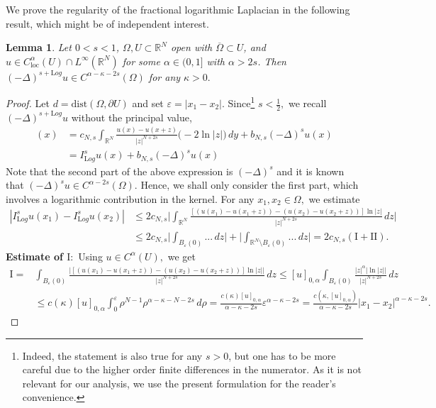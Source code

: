 \documentclass[notitlepage,11pt,reqno]{amsart}
\newtheorem{lemma}[theorem]{Lemma}
\theoremstyle{definition}
\numberwithin{equation}{section}
\newcommand{\loc}{\mathrm{loc}}
\newcommand{\RR}{\mathds{R}}
\begin{document}
We prove the regularity of the fractional logarithmic Laplacian in the following result, which might be of independent interest.
\begin{lemma}\label{holder for frac log laplacian}
  Let $0<s<1$, $\Omega,U\subset \RR^N$ open with $\overline{\Omega}\subset U$, and $u \in C^{\alpha}_{\loc}(U)\cap L^{\infty}(\RR^N)$ for some $\alpha\in (0,1]$ with $\alpha>2s$. Then $(-\Delta)^{s+\mathrm Log} u\in C^{\alpha-\kappa -2s}(\Omega)$ for any $\kappa>0.$
\end{lemma}
\begin{proof}
 Let $d=\text{dist}(\Omega, \partial U)$ and set $\varepsilon = |x_1-x_2|.$ Since\footnote{Indeed, the statement is also true for any $s>0$, but one has to be more careful due to the higher order finite differences in the numerator. As it is not relevant for our analysis, we use the present formulation for the reader's convenience.} $s<\frac{1}{2}, $ we recall $(-\Delta)^{s+\mathrm Log}u$ without the principal value,
 \begin{align*}
  [(-\Delta)^{s+\mathrm Log}u](x)&= c_{N,s}\int_{\RR^N} \frac{u(x)-u(x+z)}{|z|^{N+2s}}\bigl(-2\ln|z|\bigr)\,dy+b_{N,s}(-\Delta)^s u(x)\\
  &=I^s_{\mathrm Log}u (x)+b_{N, s}(-\Delta)^s u(x)    
 \end{align*}
 Note that the second part of the above expression is $(-\Delta)^s$ and it is known that $(-\Delta)^su \in C^{\alpha-2s}(\Omega).$ Hence, we shall only consider the first part, which involves a logarithmic contribution in the kernel. For any $x_1, x_2 \in \Omega,$ we estimate
\begin{align*}
    |I^s_{\mathrm Log} u(x_1)-I^s_{\mathrm Log} u(x_2)|&\leq 2c_{N, s}\Bigg| \int_{\RR^N}\frac{\left[(u(x_1)-u(x_1+z))-(u(x_2)-u(x_2+z))\right]\ln |z|}{|z|^{N+2s}}\, dz\Bigg|\\
    &\leq 2c_{N, s}\Bigg|\int_{B_{\varepsilon}(0)}... \, dz\Bigg|+\Bigg|\int_{\RR^N\setminus B_{\varepsilon}(0)}...\, dz\Bigg|=2c_{N, s}(\mathrm I+\mathrm {II}).
\end{align*}
\textbf{Estimate of $\mathrm I:$ } Using $u \in C^{\alpha}(U),$ we get
\begin{align*}
    \mathrm I=&\int_{B_{\varepsilon}(0)}\frac{|[(u(x_1)-u(x_1+z))-(u(x_2)-u(x_2+z))]\ln |z||}{|z|^{N+2s}}\, dz\leq [u]_{0, \alpha}\int_{B_{\varepsilon}(0)}\frac{|z|^{\alpha}|\ln |z||}{|z|^{N+2s}}\, dz\\
    &\leq c(\kappa)[u]_{0, \alpha}\int_0^{\varepsilon}\rho^{N-1}\rho^{\alpha-\kappa-N-2s}\, d\rho= \frac{c(\kappa)[u]_{0, \alpha}}{\alpha-\kappa-2s} \varepsilon^{\alpha-\kappa -2s}=\frac{c(\kappa, [u]_{0, \alpha})}{\alpha-\kappa-2s}|x_1-x_2|^{\alpha-\kappa-2s}.

\end{align*}
\end{proof}
\end{document}
